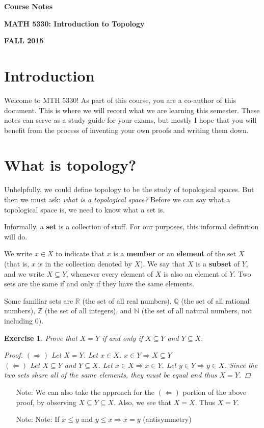\documentclass[12pt]{amsart}
\newtheorem{exercise}{Exercise}[section]
\theoremstyle{definition}
\theoremstyle{remark}
\newcommand{\Q}{\mathbb{Q}}
\newcommand{\R}{\mathbb{R}}
\newcommand{\N}{\mathbb{N}}
\newcommand{\Z}{\mathbb{Z}}
\newcommand{\0}{\emptyset}
\begin{document}
\begin{center}
\Large{\textbf{Course Notes}}

\large{\textbf{MATH 5330: Introduction to Topology}}

\large{\textbf{FALL 2015}}
\end{center}

\section{Introduction}

Welcome to MTH 5330! As part of this course, you are a co-author of this document. This is where we will record what we are learning this semester. These notes can serve as a study guide for your exams, but mostly I hope that you will benefit from the process of inventing your own proofs and writing them down.

\section{What is topology?}

Unhelpfully, we could define topology to be the study of topological spaces. But then we must ask: \textit{what is a topological space?} Before we can say what a topological space is, we need to know what a set is.

Informally, a \textbf{set} is a collection of stuff. For our purposes, this informal definition will do.

We write $x \in X$ to indicate that $x$ is a \textbf{member} or an \textbf{element} of the set $X$ (that is, $x$ is in the collection denoted by $X$). We say that $X$ is a \textbf{subset} of $Y$, and we write $X \subseteq Y$, whenever every element of $X$ is also an element of $Y$. Two sets are the same if and only if they have the same elements.

Some familiar sets are $\R$ (the set of all real numbers), $\Q$ (the set of all rational numbers), $\Z$ (the set of all integers), and $\N$ (the set of all natural numbers, not including $0$).

\begin{exercise}
Prove that $X = Y$ if and only if $X \subseteq Y$ and $Y \subseteq X$.
\begin{proof}
	$(\Rightarrow)$ Let $X=Y$. Let $x \in X$. $x \in Y \Rightarrow X \subseteq Y$
	\\$(\Leftarrow)$ Let $X \subseteq Y$ and $Y \subseteq X$. Let $x \in X \Rightarrow x \in Y$. Let $y \in Y \Rightarrow y \in X$. Since the two sets share all of the same elements, they must be equal and thus $X = Y$.
\end{proof}
\end{exercise}
\begin{itemize}
	\item[Note:] We can also take the approach for the $(\Leftarrow)$ portion of the above proof, by observing $X \subseteq Y \subseteq X$. Also, we see that $X = X$. Thus $X = Y$.
	\item[Note:] Note: If $x \leq y$ and $y \leq x \Rightarrow x=y$ (antisymmetry)
\end{itemize}
\end{document}

